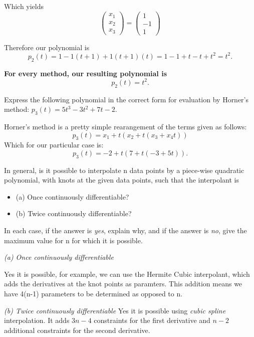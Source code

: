 \documentclass[12pt]{article}
\newenvironment{problem}[2][Problem]{\begin{trivlist}
\item[\hskip \labelsep {\bfseries #1}\hskip \labelsep {\bfseries #2.}]}{\end{trivlist}}
\begin{document}
Which yields
$$\left(\begin{smallmatrix}
x_1\\x_2\\x_3
\end{smallmatrix}\right)=
\left(\begin{smallmatrix}
1\\-1\\1
\end{smallmatrix}\right)$$

Therefore our polynomial is
$$p_2(t) = 1-1(t+1)+1(t+1)(t)=1-1+t-t+t^2 = t^2.$$

\textbf{For every method, our resulting polynomial is} $$p_2(t)=t^2.$$

\begin{problem}{7.2}
Express the following polynomial in the correct form for evaluation by Horner’s method: $p_3(t) = 5t^3 - 3t^2 + 7t - 2$.

Horner's method is a pretty simple rearangement of the terms given as follows:
$$p_3(t)=x_1+t(x_2+t(x_3+x_4t))$$
Which for our particular case is:
$$p_3(t) = -2+t(7+t(-3+5t)).$$
\end{problem}

\begin{problem}{7.5}
 In general, is it possible to interpolate n data points by a piece-wise quadratic polynomial, with knots at the given data points, such that the interpolant is
 \begin{itemize}
     \item (a) Once continuously differentiable?
     \item (b) Twice continuously differentiable?
     \end{itemize}

In each case, if the answer is \textit{yes}, explain
why, and if the answer is 
\textit{no}, give the maximum
value for n for which it is possible.

\textit{(a) Once continuously differentiable}

Yes it is possible, for example, we can use the Hermite Cubic interpolant, which adds the derivatives at the knot points as paramters. This addition means we have 4(n-1) parameters to be determined as opposed to n.

\textit{(b) Twice continuously differentiable}
 Yes it is possible using \textit{cubic spline} interpolation. It adds $3n-4$ constraints for the first derivative and $n-2$ additional constraints for the second derivative.
\end{problem}
\end{document}
